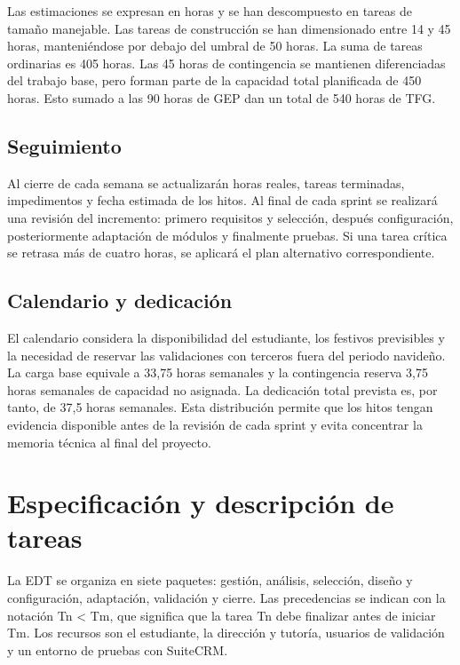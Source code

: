 Las estimaciones se expresan en horas y se han descompuesto en tareas de tamaño manejable. Las tareas de construcción se han dimensionado entre 14 y 45 horas, manteniéndose por debajo del umbral de 50 horas. La suma de tareas ordinarias es 405 horas. Las 45 horas de contingencia se mantienen diferenciadas del trabajo base, pero forman parte de la capacidad total planificada de 450 horas. Esto sumado a las 90 horas de GEP dan un total de 540 horas de TFG.

\subsection{Seguimiento}\label{sec:2-1-2}

Al cierre de cada semana se actualizarán horas reales, tareas terminadas, impedimentos y fecha estimada de los hitos. Al final de cada sprint se realizará una revisión del incremento: primero requisitos y selección, después configuración, posteriormente adaptación de módulos y finalmente pruebas. Si una tarea crítica se retrasa más de cuatro horas, se aplicará el plan alternativo correspondiente.

\subsection{Calendario y dedicación}\label{sec:2-1-3}

El calendario considera la disponibilidad del estudiante, los festivos previsibles y la necesidad de reservar las validaciones con terceros fuera del periodo navideño. La carga base equivale a 33,75 horas semanales y la contingencia reserva 3,75 horas semanales de capacidad no asignada. La dedicación total prevista es, por tanto, de 37,5 horas semanales. Esta distribución permite que los hitos tengan evidencia disponible antes de la revisión de cada sprint y evita concentrar la memoria técnica al final del proyecto.

\section{Especificación y descripción de tareas}\label{sec:2-2}

La EDT se organiza en siete paquetes: gestión, análisis, selección, diseño y configuración, adaptación, validación y cierre. Las precedencias se indican con la notación Tn \textless{} Tm, que significa que la tarea Tn debe finalizar antes de iniciar Tm. Los recursos son el estudiante, la dirección y tutoría, usuarios de validación y un entorno de pruebas con SuiteCRM.

